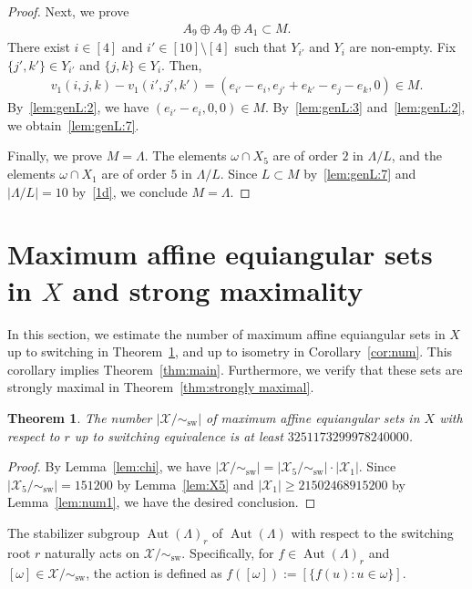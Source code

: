 \documentclass[reqno, 11pt]{amsart}
\numberwithin{equation}{section}
\newtheorem{thm}[lem]{Theorem}%
\theoremstyle{definition}
\DeclareMathOperator{\Aut}{Aut}
\DeclareMathOperator{\sw}{sw}
\newcommand{\aes}{\omega}
\newcommand{\cX}{\mathcal{X}}
\newcommand{\sr}{ r } %
\begin{document}
\begin{proof}
	Next, we prove
	\begin{align}	\label{lem:genL:7}
		A_9 \oplus A_9 \oplus A_1  \subset M.
	\end{align}
	There exist $i \in [4]$ and $i' \in [10] \setminus [4]$ such that $Y_{i'}$ and $Y_i$ are non-empty.
	Fix $\{ j',k' \} \in Y_{i'}$ and $\{j,k\} \in Y_{i}$.
	Then,
	\begin{align*}
		v_1(i,j,k)-v_1(i',j',k') = (e_{i'} - e_i , e_{j'} + e_{k'} - e_j - e_k , 0) \in M.
	\end{align*}
	By~\eqref{lem:genL:2}, we have
	$
		(e_{i'} - e_i , 0 , 0) \in M.
	$
	By~\eqref{lem:genL:3} and~\eqref{lem:genL:2}, we obtain~\eqref{lem:genL:7}.

	Finally, we prove $M=\Lambda$.
	The elements $\aes \cap X_5$ are of order $2$ in $\Lambda/L$, and the elements $\aes \cap X_1$ are of order $5$ in $\Lambda/L$.
	Since $L \subset M$ by~\eqref{lem:genL:7} and $|\Lambda/L|=10$ by~\eqref{1d},
	we conclude $M= \Lambda$.
\end{proof}



\section{Maximum affine equiangular sets in $X$ and strong maximality}	\label{sec:X}
In this section, we estimate the number of maximum affine equiangular sets in $X$ up to switching in Theorem~\ref{thm:num}, and up to isometry in Corollary~\ref{cor:num}.
This corollary implies Theorem~\ref{thm:main}.
Furthermore, we verify that these sets are strongly maximal in Theorem~\ref{thm:strongly maximal}.

\begin{thm}	\label{thm:num}
	The number $|\cX/ \sim_{\sw}|$ of maximum affine equiangular sets in $X$ with respect to $\sr$ up to switching equivalence is at least $3251173299978240000$.
\end{thm}
\begin{proof}
	By Lemma~\ref{lem:chi}, we have
	$
		|\cX/\sim_{\sw}| = |\cX_5/\sim_{\sw}| \cdot |\cX_1|.
	$
	Since $|\cX_5/\sim_{\sw}| = 151200$ by Lemma~\ref{lem:X5} and $|\cX_1| \geq 21502468915200$ by Lemma~\ref{lem:num1}, we have the desired conclusion.
\end{proof}

The stabilizer subgroup $\Aut(\Lambda)_{r}$ of $\Aut(\Lambda)$ with respect to the switching root $r$ naturally acts on $\cX/\sim_{\sw}$.
Specifically, for $f \in \Aut(\Lambda)_r$ and $[\aes] \in \cX/\sim_{\sw}$, the action is defined as $f([\aes]) := [\{ f(u) : u \in \aes \}]$.
\end{document}

